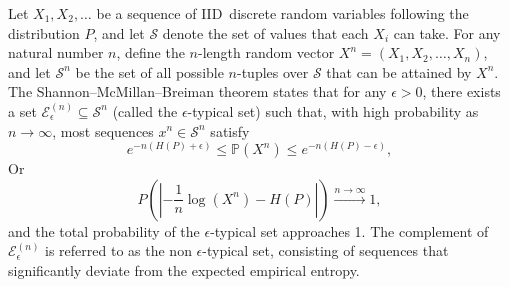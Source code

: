 \documentclass[pdflatex]{sn-jnl}%
\theoremstyle{thmstyleone}
\theoremstyle{thmstyletwo}%
\theoremstyle{thmstylethree}%
\begin{document}
Let \( X_1, X_2, \ldots \) be a sequence of IID\ discrete random variables following the distribution \( P \), and let \( \mathcal{S} \) denote the set of values that each \( X_i \) can take. For any natural number \( n \), define the \( n \)-length random vector \( X^n = (X_1, X_2, \ldots, X_n) \), and let \( \mathcal{S}^n \) be the set of all possible \( n \)-tuples over \( \mathcal{S} \) that can be attained by \( X^n \). The Shannon--McMillan--Breiman theorem\cite{algoet1988sandwich} states that for any \( \epsilon > 0 \), there exists a set \( \mathcal{E}_\epsilon^{(n)} \subseteq \mathcal{S}^n \) (called the \( \epsilon \)-typical set) such that, with high probability as \( n \to \infty \), most sequences \( x^n \in \mathcal{S}^n \) satisfy
\begin{equation}\label{equationforshannonmcmillanbreimantheorem}
e^{-n(H(P) + \epsilon)} \leq \mathbb{P}(X^n) \leq e^{-n(H(P) - \epsilon)}, 
\end{equation}
Or
\begin{equation}
P\left( \left|-\frac{1}{n}\log \left( X^n\right)-H(P) \right| \right)  \xrightarrow[]{n \to \infty}1,
\end{equation}
and the total probability of the \( \epsilon \)-typical set approaches 1. The complement of \( \mathcal{E}_\epsilon^{(n)} \) is referred to as the non \( \epsilon \)-typical set, consisting of sequences that significantly deviate from the expected empirical entropy. 
\end{document}
